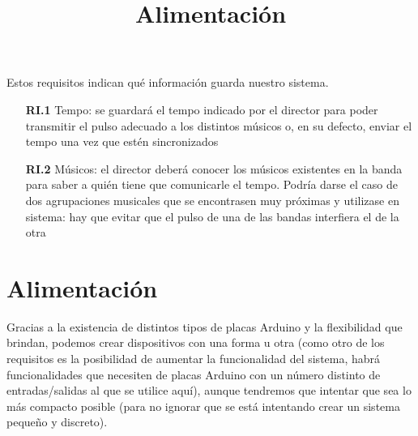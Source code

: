 Estos requisitos indican qué información guarda nuestro sistema.\\

  \begin{itemize}
    \item[\textbf{RI.1}] Tempo: se guardará el tempo indicado por el director
    para poder transmitir el pulso adecuado a los distintos músicos o, en su defecto,
    enviar el tempo una vez que estén sincronizados
    \item[\textbf{RI.2}] Músicos: el director deberá conocer los músicos existentes en la banda
    para saber a quién tiene que comunicarle el tempo. Podría darse el caso de dos
    agrupaciones musicales que se encontrasen muy próximas y utilizase en sistema:
    hay que evitar que el pulso de una de las bandas interfiera el de la otra
  \end{itemize}

\section{Alimentación}
\title{Alimentación}
Gracias a la existencia de distintos tipos de placas Arduino y la flexibilidad que brindan, podemos crear dispositivos
con una forma u otra (como otro de los requisitos es la posibilidad de aumentar la funcionalidad del sistema,
habrá funcionalidades que necesiten de placas Arduino con un número distinto de entradas/salidas al que se utilice
aquí), aunque tendremos que intentar que sea lo más compacto posible (para no ignorar que se está intentando
crear un sistema pequeño y discreto).

